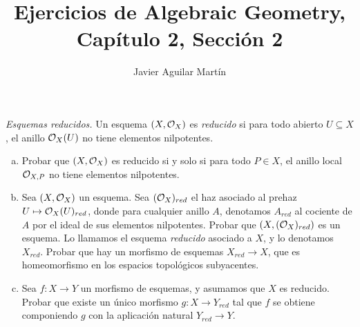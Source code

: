 \documentclass[twoside]{article}
\begin{document}
\title{Ejercicios de Algebraic Geometry, Capítulo 2, Sección 2}
\author{Javier Aguilar Martín}
\maketitle


%
%
%
%
%
%
%
%
\begin{ejercicio}{2.3}\emph{Esquemas reducidos.} Un esquema $(X,{\mathcal O}_X)$ es \emph{reducido} si para todo abierto $U\subseteq X$, el anillo ${\mathcal O}_X(U)$ no tiene elementos nilpotentes. 
\begin{enumerate}[(a)]
\item Probar que $(X,{\mathcal O}_X)$ es reducido si y solo si para todo $P\in X$, el anillo local ${\mathcal O}_{X,P}$ no tiene elementos nilpotentes. 
\item Sea $(X,{\mathcal O}_X)$ un esquema. Sea $({\mathcal O}_X)_{red}$ el haz asociado al prehaz $U\mapsto {\mathcal O}_X(U)_{red}$, donde para cualquier anillo $A$, denotamos $A_{red}$ al cociente de $A$ por el ideal de sus elementos nilpotentes. Probar que $(X, ({\mathcal O}_X)_{red})$ es un esquema. Lo llamamos el esquema \emph{reducido} asociado a $X$, y lo denotamos $X_{red}$. Probar que hay un morfismo de esquemas $X_{red}\to X$, que es homeomorfismo en los espacios topológicos subyacentes. 
\item Sea $f:X\to Y$ un morfismo de esquemas, y asumamos que $X$ es reducido. Probar que existe un único morfismo $g:X\to Y_{red}$ tal que $f$ se obtiene componiendo $g$ con la aplicación natural $Y_{red}\to Y$. 
\end{enumerate}


\end{ejercicio}
\end{document}
